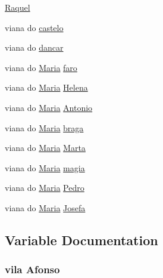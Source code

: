 \begin{DoxyCompactItemize}
\hyperlink{candidatos_8txt_a0fa004e8ae93e7afad527aaa2bb04dff}{Raquel}
\item 
viana do \hyperlink{candidatos_8txt_a7a3d2fede813d5b19ee63499917664e2}{castelo}
\item 
viana do \hyperlink{candidatos_8txt_a7a54d64ce86da7c9cb1cec1f9b572e14}{dancar}
\item 
viana do \hyperlink{sessoes_8txt_a0375353ca858a7b935ff53ef0a3c9a98}{Maria} \hyperlink{candidatos_8txt_adc6ee4336af7550893efe711a3ee0570}{faro}
\item 
viana do \hyperlink{sessoes_8txt_a0375353ca858a7b935ff53ef0a3c9a98}{Maria} \hyperlink{candidatos_8txt_a9d93dce88080548099a56cf093e4bba9}{Helena}
\item 
viana do \hyperlink{sessoes_8txt_a0375353ca858a7b935ff53ef0a3c9a98}{Maria} \hyperlink{candidatos_8txt_ad48e47e2e0f1add17c5dcd5c9dfc1381}{Antonio}
\item 
viana do \hyperlink{sessoes_8txt_a0375353ca858a7b935ff53ef0a3c9a98}{Maria} \hyperlink{candidatos_8txt_acb9307bae8c337dfbd877babfe36f1ad}{braga}
\item 
viana do \hyperlink{sessoes_8txt_a0375353ca858a7b935ff53ef0a3c9a98}{Maria} \hyperlink{candidatos_8txt_a9439c806cb17f3371bbee523ca9b13ec}{Marta}
\item 
viana do \hyperlink{sessoes_8txt_a0375353ca858a7b935ff53ef0a3c9a98}{Maria} \hyperlink{candidatos_8txt_a59134b75acc1ed74b176c98faefd5e9b}{magia}
\item 
viana do \hyperlink{sessoes_8txt_a0375353ca858a7b935ff53ef0a3c9a98}{Maria} \hyperlink{candidatos_8txt_af84719fafa1b55d65980e3a27b236714}{Pedro}
\item 
viana do \hyperlink{sessoes_8txt_a0375353ca858a7b935ff53ef0a3c9a98}{Maria} \hyperlink{candidatos_8txt_ae645720a55439c3bfd303f6840c137b1}{Josefa}
\end{DoxyCompactItemize}


\subsection{Variable Documentation}
\subsubsection[{\texorpdfstring{Afonso}{Afonso}}]{\setlength{\rightskip}{0pt plus 5cm}vila Afonso}\hypertarget{candidatos_8txt_aab193da33fe7af81c3f38956a69ddc7b}{}\label{candidatos_8txt_aab193da33fe7af81c3f38956a69ddc7b}
